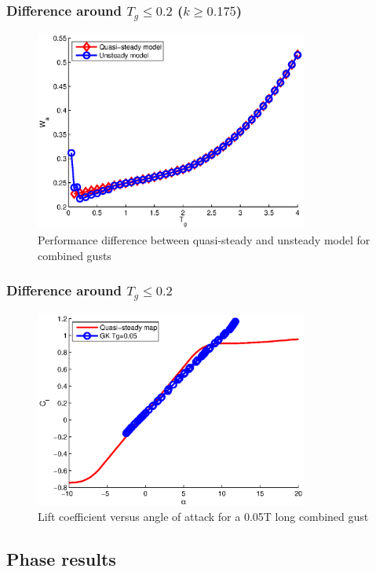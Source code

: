 \documentclass[compress]{beamer}
\begin{document}
\begin{frame}
  \frametitle{Difference around $T_g \le0.2$ ($k \ge 0.175$)}
  \begin{figure}[h]
    \centering
    \includegraphics[width=0.8\textwidth]{./Figures/LUT_vs_GK_Wg_vs_TG_windtype=3_alhpamax=12_nodalphalimit.eps}
    \caption{Performance difference between quasi-steady and unsteady model for combined gusts}
  \end{figure}
\end{frame}

\begin{frame}
  \frametitle{Difference around $T_g \le0.2$}

  \begin{figure}[h]
    \centering
    \includegraphics[width=0.8\textwidth]{./Figures/Cl_vs_alpha_Windtype=3_Tg=0p05_GK_alphamax=12.eps}
    \caption{Lift coefficient versus angle of attack for a 0.05T long combined gust}
  \end{figure}
\end{frame}

\subsection{Phase results}
\end{document}
